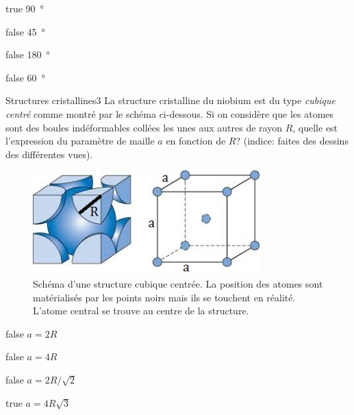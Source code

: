         \begin{reponses} 
            \item[true] \SI{90}{\degree}
            \item[false] \SI{45}{\degree} 
            \item[false] \SI{180}{\degree}
    	    \item[false] \SI{60}{\degree}
        \end{reponses}
        \begin{question}{31}{Structures cristallines}{3}{}
            La structure cristalline du niobium est du type \emph{cubique centré} comme montré par le schéma ci-dessous. Si on considère que les atomes sont des boules indéformables collées les unes aux autres de rayon $R$, quelle est l'expression du paramètre de maille $a$ en fonction de $R$? (indice: faites des dessins des différentes vues).
            \begin{figure}
                \centering
                \includegraphics[height = 4cm]{Antoine/Figures_Antoine/BCC.png}
                \caption{Schéma d'une structure cubique centrée. La position des atomes sont matérialisés par les points noirs mais ils se touchent en réalité. L'atome central se trouve au centre de la structure.}
            \end{figure}
        \end{question}
        \begin{reponses} 
            \item[false] $a = 2R$
            \item[false] $a = 4R$
            \item[false] $a = 2R/\sqrt{2}$
    	    \item[true] $a = 4R\sqrt{3}$
        \end{reponses}
